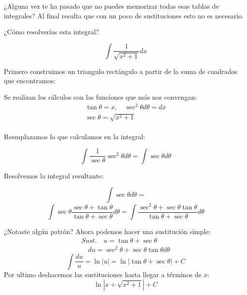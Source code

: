 \documentclass{article}
\newenvironment{cut-me-box}{
	\begin{tcolorbox}[
		colframe=white, %
		colback=white, %
		arc=1mm, %
		left=2mm, %
		right=2mm, %
		top=2mm, %
		bottom=2mm, %
		borderline={0.5mm}{0mm}{black!70!white,dashed},
		enhanced,
		boxrule=0.5mm,
		overlay={
			\node[anchor=north, yshift=-1mm, fill=white] at (frame.north east) {\large \emoji{scissors}}; %
		}
		]
	}{
	\end{tcolorbox}
}
\begin{document}
\begin{multicols}{2}
\begin{cut-me-box}
			¿Alguna vez te ha pasado que no puedes memorizar todas esas tablas de integrales? Al final resulta que con un poco de sustituciones esto no es necesario.
			
			\begin{center}
				 ¿Cómo resolverías esta integral? 
			\end{center}
			
			\[\int \frac{1}{\sqrt{x^2+1}} dx\]
			
			Primero construimos un triangulo rectángulo a partir de la suma de cuadrados que encontramos:
			
			\setlength{\columnsep}{-2cm} %
			
			\begin{multicols}{2}
				
				
				\columnbreak
				
				Se realizan los cálculos con las funciones que más nos convengan:
				\[
				\begin{array}{c}
					\tan \theta = x, \quad
					\sec^2 \theta d\theta = dx \\
					\sec \theta = \sqrt{x^2+1} \\
				\end{array}
				\]
			\end{multicols}
			
			Reemplazamos lo que calculamos en la integral:
			
			\[
			\int \frac{1}{\sec \theta} \sec^2\theta d\theta = 
			\int \sec \theta d\theta
			\]
			
			Resolvemos la integral resultante:
			
			\[
			\int \sec \theta d\theta = 
			\]
			\[
			\int \sec \theta \frac{\sec\theta + \tan\theta}{\tan\theta + \sec\theta} d\theta =
			\int \frac{\sec^2\theta + \sec\theta\tan\theta}{\tan\theta + \sec\theta} d\theta
			\]
			
			¿Notaste algún patrón? Ahora podemos hacer una sustitución simple:
			\[
			\begin{array}{c}
				Sust. \quad u = \tan\theta + \sec\theta \\
				\quad du = \sec^2\theta + \sec\theta\tan\theta d\theta
			\end{array}
			\]
			\[
			\int \frac{du}{u} = \ln| u | = \ln| \tan\theta + \sec\theta | + C
			\]
			Por ultimo deshacemos las sustituciones hasta llegar a términos de $x$:
			\[
			\ln| x + \sqrt{x^2+1} | + C
			\]
		\end{cut-me-box}
	\end{multicols}
	
	
\end{document}
